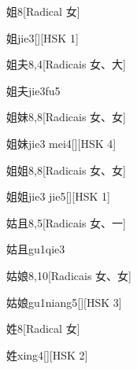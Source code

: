 \begin{entry}{姐}{8}[Radical ⼥]
  \begin{phonetics}{姐}{jie3}[][HSK 1]
  \end{phonetics}
\end{entry}

\begin{entry}{姐夫}{8,4}[Radicais ⼥、⼤]
  \begin{phonetics}{姐夫}{jie3fu5}
  \end{phonetics}
\end{entry}

\begin{entry}{姐妹}{8,8}[Radicais ⼥、⼥]
  \begin{phonetics}{姐妹}{jie3 mei4}[][HSK 4]
  \end{phonetics}
\end{entry}

\begin{entry}{姐姐}{8,8}[Radicais ⼥、⼥]
  \begin{phonetics}{姐姐}{jie3 jie5}[][HSK 1]
  \end{phonetics}
\end{entry}

\begin{entry}{姑且}{8,5}[Radicais ⼥、⼀]
  \begin{phonetics}{姑且}{gu1qie3}
  \end{phonetics}
\end{entry}

\begin{entry}{姑娘}{8,10}[Radicais ⼥、⼥]
  \begin{phonetics}{姑娘}{gu1niang5}[][HSK 3]
  \end{phonetics}
\end{entry}

\begin{entry}{姓}{8}[Radical ⼥]
  \begin{phonetics}{姓}{xing4}[][HSK 2]
  \end{phonetics}
\end{entry}

